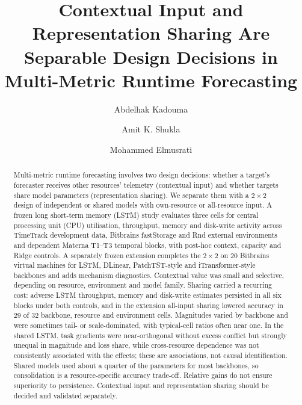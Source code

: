 \documentclass[a4paper,fleqn]{cas-dc}
\begin{document}

\title[mode=title]{Contextual Input and Representation Sharing Are Separable Design Decisions in Multi-Metric Runtime Forecasting}

\author[1]{Abdelhak Kadouma}
\cormark[1]

\author[1,2]{Amit K. Shukla}

\author[1]{Mohammed Elmusrati}




\begin{abstract}
Multi-metric runtime forecasting involves two design decisions: whether a
target's forecaster receives other resources' telemetry (contextual input)
and whether targets share model parameters (representation sharing). We
separate them with a $2\times2$ design of independent or shared models with
own-resource or all-resource input. A frozen long short-term memory (LSTM)
study evaluates three cells for central processing unit (CPU) utilisation,
throughput, memory and disk-write activity across TimeTrack development
data, Bitbrains fastStorage and Rnd external environments and dependent
Materna T1--T3 temporal blocks, with post-hoc context, capacity and Ridge
controls. A separately frozen extension completes the $2\times2$ on 20
Bitbrains virtual machines for LSTM, DLinear, PatchTST-style and
iTransformer-style backbones and adds mechanism diagnostics. Contextual
value was small and selective, depending on resource, environment and model
family. Sharing carried a recurring cost: adverse LSTM throughput, memory
and disk-write estimates persisted in all six blocks under both controls,
and in the extension all-input sharing lowered accuracy in 29 of 32
backbone, resource and environment cells. Magnitudes varied by backbone and
were sometimes tail- or scale-dominated, with typical-cell ratios often near
one. In the shared LSTM, task gradients were
near-orthogonal without excess conflict but strongly unequal in magnitude
and loss share, while cross-resource dependence was not consistently
associated with the effects;
these are associations, not causal identification. Shared models used
about a quarter of the parameters for most backbones, so consolidation is a
resource-specific accuracy trade-off. Relative gains do not ensure
superiority to persistence. Contextual input and representation sharing
should be decided and validated separately.
\end{abstract}
\end{document}

